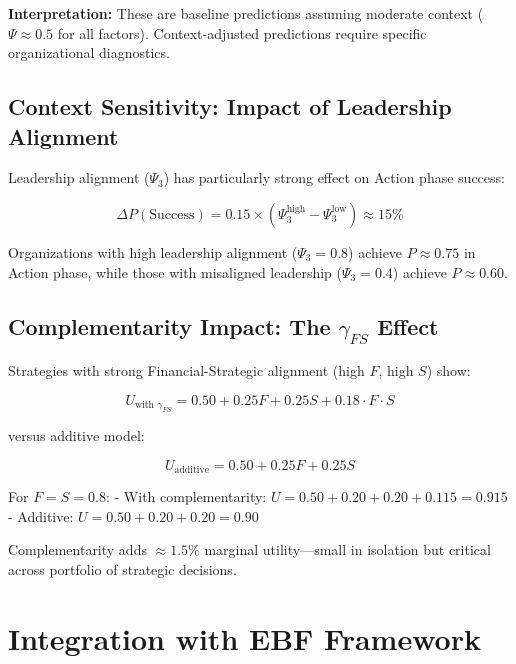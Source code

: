 \textbf{Interpretation:} These are baseline predictions assuming moderate context ($\Psi \approx 0.5$ for all factors). Context-adjusted predictions require specific organizational diagnostics.

\subsection{Context Sensitivity: Impact of Leadership Alignment}

Leadership alignment ($\Psi_3$) has particularly strong effect on Action phase success:

\begin{equation}
\Delta P(\text{Success}) = 0.15 \times (\Psi_3^{\text{high}} - \Psi_3^{\text{low}}) \approx 15\%
\end{equation}

Organizations with high leadership alignment ($\Psi_3=0.8$) achieve $P \approx 0.75$ in Action phase, while those with misaligned leadership ($\Psi_3=0.4$) achieve $P \approx 0.60$.

\subsection{Complementarity Impact: The $\gamma_{FS}$ Effect}

Strategies with strong Financial-Strategic alignment (high $F$, high $S$) show:

\begin{equation}
U_{\text{with } \gamma_{FS}} = 0.50 + 0.25F + 0.25S + 0.18 \cdot F \cdot S
\end{equation}

versus additive model:

\begin{equation}
U_{\text{additive}} = 0.50 + 0.25F + 0.25S
\end{equation}

For $F = S = 0.8$:
- With complementarity: $U = 0.50 + 0.20 + 0.20 + 0.115 = 0.915$
- Additive: $U = 0.50 + 0.20 + 0.20 = 0.90$

Complementarity adds $\approx 1.5\%$ marginal utility---small in isolation but critical across portfolio of strategic decisions.

\section{Integration with EBF Framework}
\label{sec:sdm-integration}

